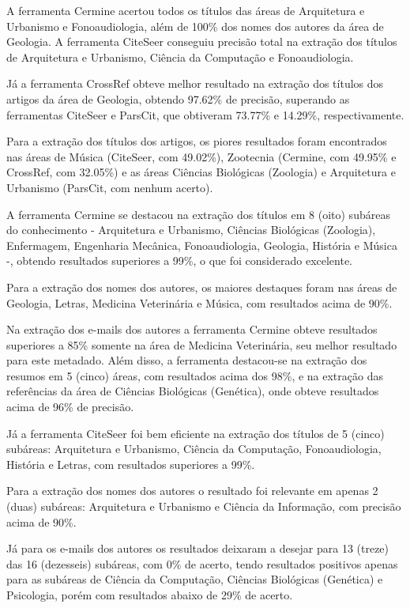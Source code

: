 A ferramenta Cermine acertou todos os títulos das áreas de Arquitetura e Urbanismo e Fonoaudiologia, além de 100\% dos nomes dos autores da área de Geologia. A ferramenta CiteSeer conseguiu precisão total na extração dos títulos de Arquitetura e Urbanismo, Ciência da Computação e Fonoaudiologia. 

Já a ferramenta CrossRef obteve melhor resultado na extração dos títulos dos artigos da área de Geologia, obtendo 97.62\% de precisão, superando as ferramentas CiteSeer e ParsCit, que obtiveram 73.77\% e 14.29\%, respectivamente.

Para a extração dos títulos dos artigos, os piores resultados foram encontrados nas áreas de Música (CiteSeer, com 49.02\%), Zootecnia (Cermine, com 49.95\% e CrossRef, com 32.05\%) e as áreas Ciências Biológicas (Zoologia) e Arquitetura e Urbanismo (ParsCit, com nenhum acerto).

A ferramenta Cermine se destacou na extração dos títulos em 8 (oito) subáreas do conhecimento - Arquitetura e Urbanismo, Ciências Biológicas (Zoologia), Enfermagem, Engenharia Mecânica, Fonoaudiologia, Geologia, História e Música -, obtendo resultados superiores a 99\%, o que foi considerado excelente. 

Para a extração dos nomes dos autores, os maiores destaques foram nas áreas de Geologia, Letras, Medicina Veterinária e Música, com resultados acima de 90\%. 

Na extração dos e-mails dos autores a ferramenta Cermine obteve resultados superiores a 85\% somente na área de Medicina Veterinária, seu melhor resultado para este metadado. Além disso, a ferramenta destacou-se na extração dos resumos em 5 (cinco) áreas, com resultados acima dos 98\%, e na extração das referências da área de Ciências Biológicas (Genética), onde obteve resultados acima de 96\% de precisão.

Já a ferramenta CiteSeer foi bem eficiente na extração dos títulos de 5 (cinco) subáreas: Arquitetura e Urbanismo, Ciência da Computação, Fonoaudiologia, História e Letras, com resultados superiores a 99\%. 

Para a extração dos nomes dos autores o resultado foi relevante em apenas 2 (duas) subáreas: Arquitetura e Urbanismo e Ciência da Informação, com precisão acima de 90\%. 

Já para os e-mails dos autores os resultados deixaram a desejar para 13 (treze) das 16 (dezesseis) subáreas, com 0\% de acerto, tendo resultados positivos apenas para as subáreas de Ciência da Computação, Ciências Biológicas (Genética) e Psicologia, porém com resultados abaixo de 29\% de acerto.

